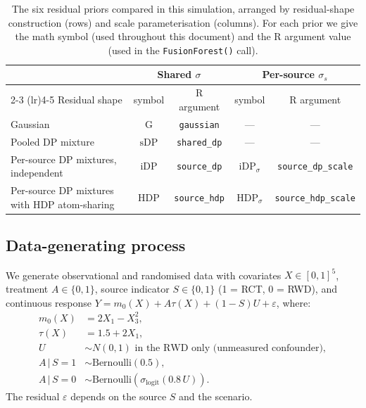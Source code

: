 \documentclass[11pt]{article}
\theoremstyle{plain}
\theoremstyle{definition}
\theoremstyle{remark}
\newcommand{\1}{\mathds{1}}
\newcommand{\given}{\,|\,}
\newcommand{\mGauss}{\ensuremath{\mathrm{G}}}
\newcommand{\mShDP}{\ensuremath{\mathrm{sDP}}}
\newcommand{\miDP}{\ensuremath{\mathrm{iDP}}}
\newcommand{\miDPs}{\ensuremath{\mathrm{iDP}_\sigma}}
\newcommand{\mHDP}{\ensuremath{\mathrm{HDP}}}
\newcommand{\mHDPs}{\ensuremath{\mathrm{HDP}_\sigma}}
\begin{document}
\begin{table}[tb]
\centering
\caption{The six residual priors compared in this simulation,
arranged by residual-shape construction (rows) and scale
parameterisation (columns). For each prior we give the math symbol
(used throughout this document) and the R argument value (used in
the \texttt{FusionForest()} call).}
\label{tab:sim-prior-grid}
\begin{tabular}{lcccc}
\toprule
& \multicolumn{2}{c}{Shared $\sigma$} & \multicolumn{2}{c}{Per-source $\sigma_s$} \\
\cmidrule(lr){2-3} \cmidrule(lr){4-5}
Residual shape & symbol & R argument & symbol & R argument \\
\midrule
Gaussian                                     & \mGauss & \texttt{gaussian}    & ---     & --- \\
Pooled DP mixture                            & \mShDP  & \texttt{shared\_dp}  & ---     & --- \\
Per-source DP mixtures, independent          & \miDP   & \texttt{source\_dp}  & \miDPs  & \texttt{source\_dp\_scale} \\
Per-source DP mixtures with HDP atom-sharing & \mHDP   & \texttt{source\_hdp} & \mHDPs  & \texttt{source\_hdp\_scale} \\
\bottomrule
\end{tabular}
\end{table}

\subsection{Data-generating process}
\label{sec:sim-dgp}

We generate observational and randomised data with covariates
$X \in [0,1]^5$, treatment $A \in \{0,1\}$, source indicator
$S \in \{0,1\}$ (1 = RCT, 0 = RWD), and continuous response
$Y = m_0(X) + A \tau(X) + (1 - S) U + \varepsilon$, where:
\begin{align*}
  m_0(X)    &= 2 X_1 - X_3^2, \\
  \tau(X)   &= 1.5 + 2 X_1, \\
  U         &\sim N(0, 1) \text{ in the RWD only (unmeasured confounder)}, \\
  A \given S = 1 &\sim \mathrm{Bernoulli}(0.5), \\
  A \given S = 0 &\sim \mathrm{Bernoulli}(\sigma_{\text{logit}}(0.8\, U)).
\end{align*}
The residual $\varepsilon$ depends on the source $S$ and the
scenario.
\end{document}

